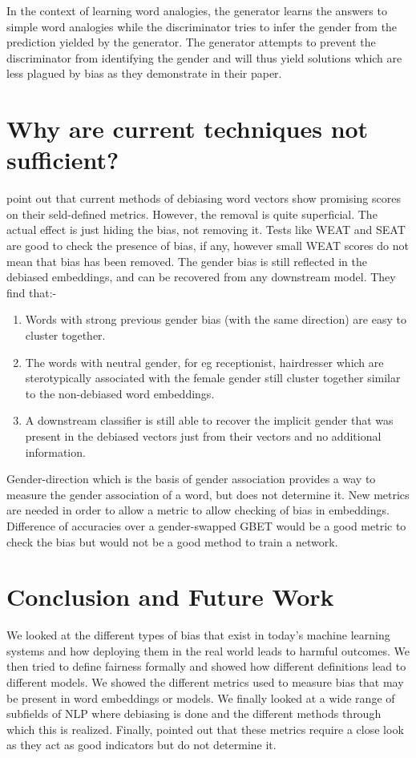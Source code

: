 \documentclass[11pt,a4paper]{article}
\begin{document}
\begin{enumerate}
    In the context of learning word analogies, the generator learns the answers to simple word analogies while the discriminator tries to infer the gender from the prediction yielded by the generator. The generator attempts to prevent the discriminator from identifying the gender and will thus yield solutions which are less plagued by bias as they demonstrate in their paper. 
\end{enumerate}
\section{Why are current techniques not sufficient?}
\label{sec:current}
\citet{gonen-goldberg-2019-lipstick} point out that current methods of debiasing word vectors show promising scores on their seld-defined metrics. However, the removal is quite superficial. The actual effect is just hiding the bias, not removing it. Tests like WEAT and SEAT are good to check the presence of bias, if any, however small WEAT scores do not mean that bias has been removed. The gender bias is still reflected in the debiased embeddings, and can be recovered from any downstream model. They find that:-
\begin{enumerate}
    \item Words with strong previous gender bias (with the same direction) are easy to cluster together.
    \item The words with neutral gender, for eg receptionist, hairdresser which are sterotypically associated with the female gender still cluster together similar to the non-debiased word embeddings.
    \item A downstream classifier is still able to recover the implicit gender that was present in the debiased vectors just from their vectors and no additional information.
\end{enumerate}
Gender-direction which is the basis of gender association provides a way to measure the gender association of a word, but does not determine it. New metrics are needed in order to allow a metric to allow checking of bias in embeddings. Difference of accuracies over a gender-swapped GBET would be a good metric to check the bias but would not be a good method to train a network.


\section{Conclusion and Future Work}
\label{sec:future}
We looked at the different types of bias that exist in today's machine learning systems and how deploying them in the real world leads to harmful outcomes. We then tried to define fairness formally and showed how different definitions lead to different models. We showed the different metrics used to measure bias that may be present in word embeddings or models. We finally looked at a wide range of subfields of NLP where debiasing is done and the different methods through which this is realized. Finally, \citet{gonen-goldberg-2019-lipstick} pointed out that these metrics require a close look as they act as good indicators but do not determine it.
\end{document}
